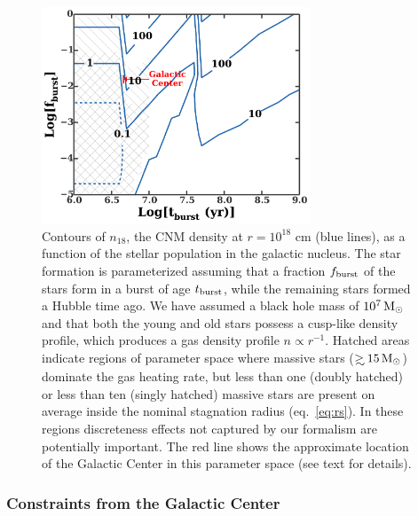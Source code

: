 \documentclass[usenatbib,fleqn]{mnras}
\newcommand\gsim{\mathrel{\rlap{\lower4pt\hbox{\hskip1pt$\sim$}}
    \raise1pt\hbox{$>$}}}
\newcommand{\Msun}{{\rm M_\odot}}
\begin{document}
\begin{figure} 
  \includegraphics[width=8cm]{cnm_plot.pdf}
  \caption{\label{fig:param} Contours of $n_{18}$, the CNM density at
    $r = 10^{18}$ cm (blue lines), as a function of the stellar
    population in the galactic nucleus.  The star formation is
    parameterized assuming that a fraction $f_{\rm burst}$ of the
    stars form in a burst of age $t_{\rm burst}$, while the remaining
    stars formed a Hubble time ago.  We have assumed a black hole mass
    of $10^{7} \, \Msun$ and that both the young and old stars possess
    a cusp-like density profile, which produces a gas density profile
    $n \propto r^{-1}$.  Hatched areas indicate regions of parameter
    space where massive stars ($\gsim 15 \, \Msun$) dominate the gas
    heating rate, but less than one (doubly hatched) or less than ten
    (singly hatched) massive stars are present on average inside the
    nominal stagnation radius (eq.~\ref{eq:rs}).  In these regions
    discreteness effects not captured by our formalism are potentially
    important. The red line shows the approximate location of the
    Galactic Center in this parameter space (see text for details).}
\end{figure}



\subsubsection{Constraints from the Galactic Center}
\label{sec:empirical}
\end{document}
